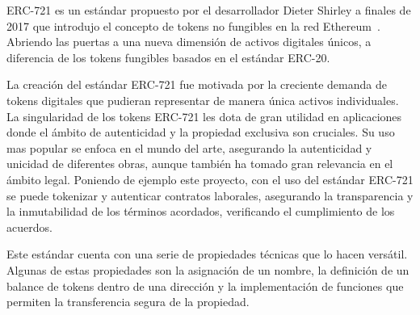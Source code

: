 ERC-721 es un estándar propuesto por el desarrollador Dieter Shirley a finales de 2017 que introdujo el concepto de tokens no fungibles en la red Ethereum~\cite{ERC721Introducción}.
Abriendo las puertas a una nueva dimensión de activos digitales únicos, a diferencia de los tokens fungibles basados en el estándar ERC-20.

La creación del estándar ERC-721 fue motivada por la creciente demanda de tokens digitales que pudieran representar de manera única activos individuales.
La singularidad de los tokens ERC-721 les dota de gran utilidad en aplicaciones donde el ámbito de autenticidad y la propiedad exclusiva son cruciales.
Su uso mas popular se enfoca en el mundo del arte, asegurando la autenticidad y unicidad de diferentes obras, aunque también ha tomado gran relevancia en el ámbito legal. 
Poniendo de ejemplo este proyecto, con el uso del estándar ERC-721 se puede tokenizar y autenticar contratos laborales, asegurando la transparencia y la inmutabilidad de los términos acordados, verificando el cumplimiento de los acuerdos.

Este estándar cuenta con una serie de propiedades técnicas que lo hacen versátil. Algunas de estas propiedades son la asignación de un nombre, la definición de un balance de tokens dentro de una dirección y la implementación de funciones que permiten la transferencia segura de la propiedad.

